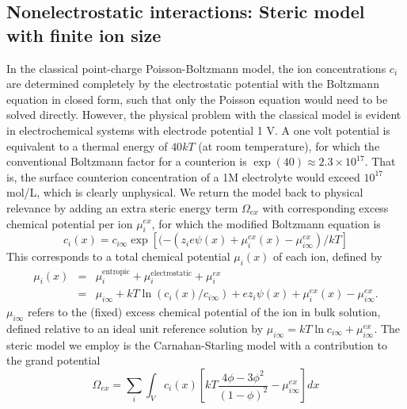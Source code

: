 \subsection{Nonelectrostatic interactions: Steric model with  finite ion size}

 In the classical point-charge Poisson-Boltzmann model, the
ion concentrations $c_i$ are determined completely by the
electrostatic potential with the Boltzmann equation in closed form,
such that
only the Poisson equation would need to be solved directly. However, the
physical problem with the classical model is evident in electrochemical
systems with electrode potential 1 V. A one volt potential is
equivalent to a thermal energy of $40 kT$ (at room temperature), for which the conventional
Boltzmann factor for a counterion is
$\exp(40)\approx 2.3 \times 10^{17}$.  That is, the surface counterion
concentration of a 1M electrolyte would exceed $10^{17}$ mol/L, which
is clearly unphysical.  We return the model back to physical
relevance by adding an extra steric energy term $\Omega_{ex}$ with
corresponding excess chemical potential per ion $\mu_{i}^{ex}$, for
which the modified Boltzmann equation is
\begin{equation}
    c_i(x)=c_{i\infty}\exp\left[(-(z_i e \psi(x) + \mu_i^{ex}(x)-\mu_{i\infty}^{ex})/kT\right]
    \label{general_Boltzmann}
\end{equation}
This corresponds to a total chemical potential $\mu_i(x)$ of each ion,
defined by
\begin{eqnarray}
  \mu_i(x) &=& \mu_{i}^{\textrm{entropic}} +  \mu_{i}^{\textrm{electrostatic}} +
               \mu_{i}^{ex} \\
{} &  =&\mu_{i\infty} + kT \ln(c_i(x)/c_{i\infty})
         + ez_i \psi(x) + \mu_i^{ex}(x)-\mu_{i\infty}^{ex}.
         \label{chem_pot}
\end{eqnarray}
$\mu_{i\infty}$ refers to the (fixed) excess chemical potential of the
ion in bulk solution, defined relative to an ideal unit
reference solution by $\mu_{i\infty} = kT\ln c_{i\infty} + \mu_{i\infty}^{ex}$.
The steric model we employ is the Carnahan-Starling model
\citep{CarnahanStarling1969} with a contribution to the grand potential
\begin{equation}
    \Omega_{ex} = \sum_{i} \int_{V} c_{i}(x) \left[ kT
    \frac{4\phi - 3\phi^2}{(1-\phi)^2}
    -  \mu_{i\infty}^{ex}
  \right]dx
  \label{CS_energy_functional}
\end{equation}
